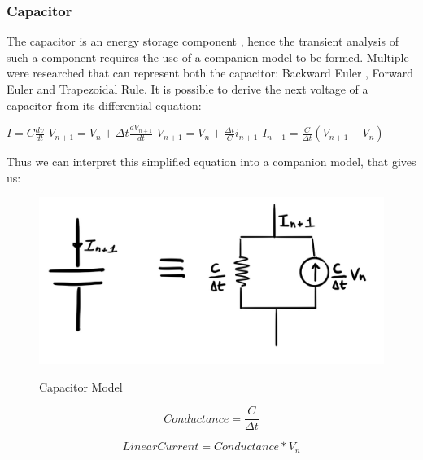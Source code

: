\documentclass{article}
\begin{document}
\subsubsection{Capacitor}
The capacitor is an energy storage component , hence the transient analysis of such a component requires the use of a companion model to be formed. Multiple were researched that can represent both the capacitor: Backward Euler , Forward Euler and Trapezoidal Rule. It is possible to derive the next voltage of a capacitor from its differential equation:
\bigbreak

$I = C\frac{dv}{dt}$
\medbreak
$V_{n+1} = V_n + \Delta t\frac{dV_{n+1}}{dt}$
\medbreak
$V_{n+1} = V_n + \frac{\Delta t}{C}i_{n+1}$
\medbreak
$I_{n+1} = \frac{C}{\Delta t}(V_{n+1}-V_n)$
\bigbreak

Thus we can interpret this simplified equation into a companion model, that gives us: 

\bigbreak

\begin{figure}[h]
    \caption{Capacitor Model}
    \centering
    \includegraphics[width=\textwidth]{images/CapModel.jpg}
    \label{fig:CapModel}
\end{figure}

\bigbreak

\noindent\begin{minipage}{.4\linewidth}
\begin{equation}
  Conductance = \frac{C}{\Delta t}
\end{equation}
\end{minipage}%
\begin{minipage}{.7\linewidth}
\begin{equation}
  LinearCurrent = Conductance*V_n
\end{equation}
\end{minipage}

\bigbreak 
\end{document}

